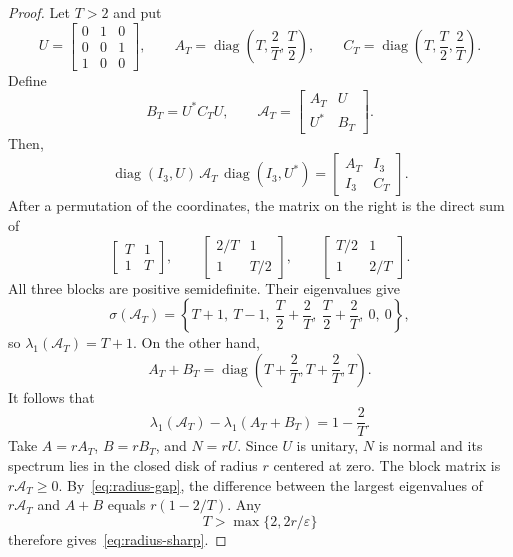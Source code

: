\documentclass[10pt,a4paper]{amsart}
\numberwithin{equation}{section}
\newcommand{\diag}{\operatorname{diag}}
\newcommand{\spec}{\sigma}
\begin{document}
\begin{proof}
Let $T>2$ and put
\[
 U=\begin{bmatrix}0&1&0\\0&0&1\\1&0&0\end{bmatrix},
 \qquad
 A_T=\diag\left(T,\frac2T,\frac T2\right),
 \qquad
 C_T=\diag\left(T,\frac T2,\frac2T\right).
\]
Define
\[
 B_T=U^*C_TU,
 \qquad
 \mathcal A_T=\begin{bmatrix}A_T&U\\U^*&B_T\end{bmatrix}.
\]
Then,
\[
 \diag(I_3,U)\,\mathcal A_T\,\diag(I_3,U^*)
 =\begin{bmatrix}A_T&I_3\\I_3&C_T\end{bmatrix}.
\]
After a permutation of the coordinates, the matrix on the right is the direct sum of
\[
 \begin{bmatrix}T&1\\1&T\end{bmatrix},
 \qquad
 \begin{bmatrix}2/T&1\\1&T/2\end{bmatrix},
 \qquad
 \begin{bmatrix}T/2&1\\1&2/T\end{bmatrix}.
\]
All three blocks are positive semidefinite. Their eigenvalues give
\[
 \spec(\mathcal A_T)
 =\left\{T+1,\ T-1,\ \frac T2+\frac2T,\ \frac T2+\frac2T,\ 0,\ 0\right\},
\]
so $\lambda_1(\mathcal A_T)=T+1$. On the other hand,
\[
 A_T+B_T=\diag\left(T+\frac2T,T+\frac2T,T\right).
\]
It follows that
\begin{equation}\label{eq:radius-gap}
 \lambda_1(\mathcal A_T)-\lambda_1(A_T+B_T)=1-\frac2T.
\end{equation}
Take $A=rA_T$, $B=rB_T$, and $N=rU$. Since $U$ is unitary, $N$ is normal and its spectrum lies in the closed disk of radius $r$ centered at zero. The block matrix is $r\mathcal A_T\geq0$. By~\eqref{eq:radius-gap}, the difference between the largest eigenvalues of $r\mathcal A_T$ and $A+B$ equals $r(1-2/T)$. Any
\[
 T>\max\{2,2r/\varepsilon\}
\]
therefore gives~\eqref{eq:radius-sharp}.
\end{proof}
\end{document}
